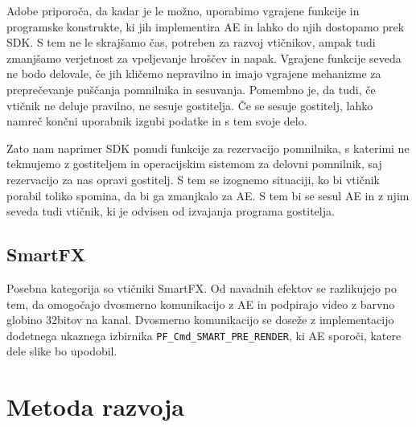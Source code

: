 \documentclass[a4paper, 12pt]{book}
\begin{document}

Adobe priporoča, da kadar je le možno, uporabimo vgrajene funkcije in programske konstrukte, ki jih implementira AE in lahko do njih dostopamo prek SDK. 
S tem ne le skrajšamo čas, potreben za razvoj vtičnikov, ampak tudi zmanjšamo verjetnost za vpeljevanje hroščev in napak. 
Vgrajene funkcije seveda ne bodo delovale, če jih kličemo nepravilno in imajo vgrajene mehanizme za preprečevanje puščanja pomnilnika in sesuvanja. 
Pomembno je, da tudi, če vtičnik ne deluje pravilno, ne sesuje gostitelja. 
Če se sesuje gostitelj, lahko namreč končni uporabnik izgubi podatke in s tem svoje delo. 

Zato nam naprimer SDK ponudi funkcije za rezervacijo pomnilnika, s katerimi ne tekmujemo z gostiteljem in operacijskim sistemom za delovni pomnilnik, saj rezervacijo za nas opravi gostitelj.
S tem se izognemo situaciji, ko bi vtičnik porabil toliko spomina, da bi ga zmanjkalo za AE. 
S tem bi se sesul AE in z njim seveda tudi vtičnik, ki je odvisen od izvajanja programa gostitelja.


\subsection{SmartFX} %

Posebna kategorija so vtičniki SmartFX. 
Od navadnih efektov se razlikujejo po tem, da omogočajo dvosmerno komunikacijo z AE in podpirajo video z barvno globino 32bitov na kanal. 
Dvosmerno komunikacijo se doseže z  implementacijo dodetnega ukaznega izbirnika {\tt PF\_Cmd\_SMART\_PRE\_RENDER}, ki AE sporoči, katere dele slike bo upodobil. 


\section{Metoda razvoja}
\end{document}

